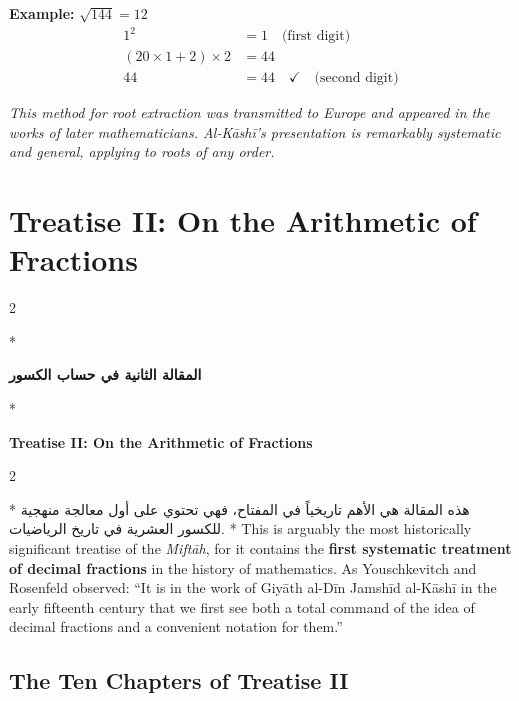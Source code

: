 \documentclass[11pt,a4paper]{article}
\newcommand{\cnote}[1]{\textcolor{notecolor}{\textit{#1}}}
\newcommand{\ar}[1]{\arabicfont\beginR #1\endR}
\newenvironment{bilingual}{%
  \vspace{0.3em}%
  \begin{paracol}{2}%
}{%
  \end{paracol}%
  \vspace{0.3em}%
}
\begin{document}
\noindent\textbf{Example:} $\sqrt{144} = 12$
\begin{align*}
1^2 &= 1 \quad \text{(first digit)} \\
(20 \times 1 + 2) \times 2 &= 44 \\
44 &= 44 \quad \checkmark \quad \text{(second digit)}
\end{align*}

\cnote{This method for root extraction was transmitted to Europe and
appeared in the works of later mathematicians. Al-K\=ash\=i's presentation
is remarkably systematic and general, applying to roots of any order.}
\clearpage

\section{Treatise II: On the Arithmetic of Fractions}
\label{sec:treatise2}

\begin{bilingual}
\switchcolumn[0]*
\begin{center}
\textbf{\Large\color{chapcolor}\ar{المقالة الثانية في حساب الكسور}}
\end{center}
\switchcolumn[1]*
\begin{center}
\textbf{\Large\color{chapcolor}Treatise II: On the Arithmetic of Fractions}
\end{center}
\end{bilingual}

\begin{bilingual}
\switchcolumn[0]*
\ar{هذه المقالة هي الأهم تاريخياً في المفتاح، فهي تحتوي على أول معالجة منهجية للكسور العشرية في تاريخ الرياضيات.}
\switchcolumn[1]*
This is arguably the most historically significant treatise of the
\textit{Mift\=ah}, for it contains the \textbf{first systematic
treatment of decimal fractions} in the history of mathematics. As
Youschkevitch and Rosenfeld observed: ``It is in the work of Giy\=ath
al-D\=in Jamsh\=id al-K\=ash\=i in the early fifteenth century that we first see
both a total command of the idea of decimal fractions and a convenient
notation for them.''
\end{bilingual}

\subsection{The Ten Chapters of Treatise II}
\end{document}
